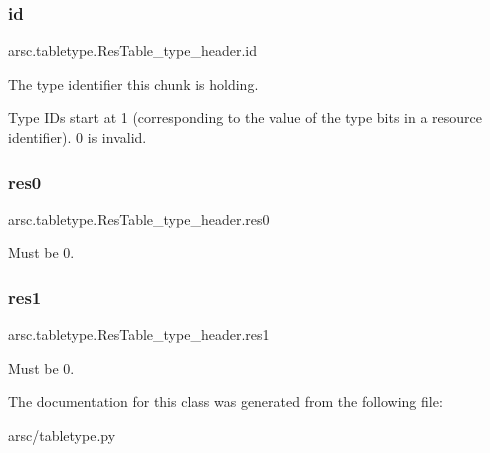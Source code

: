 \subsubsection{\texorpdfstring{id}{id}}
{\footnotesize\ttfamily arsc.\+tabletype.\+Res\+Table\+\_\+type\+\_\+header.\+id}



The type identifier this chunk is holding. 

Type I\+Ds start at 1 (corresponding to the value of the type bits in a resource identifier). 0 is invalid. \mbox{\label{classarsc_1_1tabletype_1_1ResTable__type__header_a7f7636b7613e62a763247aa807bbeb6c}} 
\subsubsection{\texorpdfstring{res0}{res0}}
{\footnotesize\ttfamily arsc.\+tabletype.\+Res\+Table\+\_\+type\+\_\+header.\+res0}



Must be 0. 

\mbox{\label{classarsc_1_1tabletype_1_1ResTable__type__header_ab67ee6048e79cef10c45b4d619f515d9}} 
\subsubsection{\texorpdfstring{res1}{res1}}
{\footnotesize\ttfamily arsc.\+tabletype.\+Res\+Table\+\_\+type\+\_\+header.\+res1}



Must be 0. 



The documentation for this class was generated from the following file\+:\begin{DoxyCompactItemize}
\item 
arsc/tabletype.\+py\end{DoxyCompactItemize}
